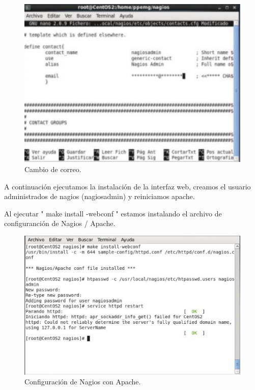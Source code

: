 \begin{figure}[H]
\begin{center}
\includegraphics[scale=0.6]{imagenes/opcional2-3.eps}
\caption{Cambio de correo.}
\end{center}
\end{figure}


A continuación ejecutamos la instalación de la interfaz web, creamos el usuario administrados de nagios (nagiosadmin) y reiniciamos apache.

Al ejecutar " make install -webconf " estamos instalando el archivo de configuranción de Nagios / Apache.

\begin{figure}[H]
\begin{center}
\includegraphics[scale=0.4]{imagenes/opcional2-4.eps}
\caption{Configuración de Nagios con Apache.}
\end{center}
\end{figure}

